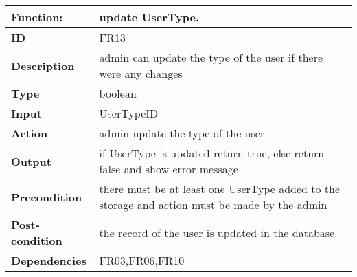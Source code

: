 \documentclass[]{article}
\begin{document}
\FloatBarrier
\begin{table}[h]
\caption{}
\label{tab:my-table}
\begin{tabular}{|p{}|p{}|}
\hline
\textbf{Function:} & update UserType.
\\ \hline
\textbf{ID}  & FR13           

\\ \hline
\textbf{Description}    & admin can update the type of the user if there were any changes                                                                  
\\ \hline
\textbf{Type}    & boolean  

\\ \hline
\textbf{Input}        & UserTypeID


\\ \hline
\textbf{Action}            & admin update the type of the user

\\ \hline
\textbf{Output}            & if UserType is updated return true, else return false and show error message

\\ \hline
\textbf{Precondition}           & there must be at least one UserType added to the storage and action must be made by the admin 

\\ \hline
\textbf{Post-condition}           & the record of the user is updated in the database


\\ \hline
\textbf{Dependencies}           & FR03,FR06,FR10
\\ \hline
\end{tabular}
\end{table}
\end{document}
